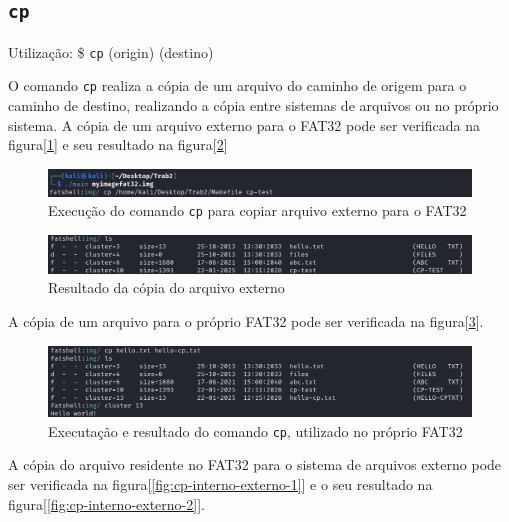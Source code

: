 \documentclass[
    12pt,				%
    oneside,   	        %
    a4paper,			%
    english,			%
    french,				%
    spanish,			%
    brazil,				%
    ]{pacotes/abntex2}
\begin{document}

\subsection{\texttt{cp}}
\label{subsec:cp}
Utilização: \$ \texttt{cp} (origin) (destino)

O comando \texttt{cp} realiza a cópia de um arquivo do caminho de origem para o caminho de destino, realizando a cópia entre sistemas de arquivos ou no próprio sistema. A cópia de um arquivo externo para o FAT32 pode ser verificada na figura[\ref{fig:cp-externo-interno-1}] e seu resultado na figura[\ref{fig:cp-externo-interno-2}]

\begin{figure}[H]
    \centering
    \includegraphics[width=450pt]{figuras/resultados/3.1-cp-externo-interno.PNG}
    \caption{Execução do comando \texttt{cp} para copiar arquivo externo para o FAT32}
    \label{fig:cp-externo-interno-1}
\end{figure}

\begin{figure}[H]
    \centering
    \includegraphics[width=450pt]{figuras/resultados/3.2-cp-externo-interno.PNG}
    \caption{Resultado da cópia do arquivo externo}
    \label{fig:cp-externo-interno-2}
\end{figure}

A cópia de um arquivo para o próprio FAT32 pode ser verificada na figura[\ref{fig:cp-interno-attr}].

\begin{figure}[H]
    \centering
    \includegraphics[width=450pt]{figuras/resultados/5-cp-interno-attr.PNG}
    \caption{Executação e resultado do comando \texttt{cp}, utilizado no próprio FAT32}
    \label{fig:cp-interno-attr}
\end{figure}

A cópia do arquivo residente no FAT32 para o sistema de arquivos externo pode ser verificada na figura[\ref{fig:cp-interno-externo-1}] e o seu resultado na figura[\ref{fig:cp-interno-externo-2}].
\end{document}
